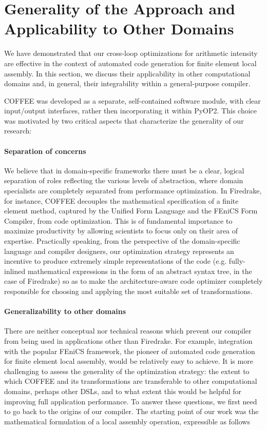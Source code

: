 \section{Generality of the Approach and Applicability to Other Domains}
\label{sec:generality}
We have demonstrated that our cross-loop optimizations for arithmetic intensity are effective in the context of automated code generation for finite element local assembly. In this section, we discuss their applicability in other computational domains and, in general, their integrability within a general-purpose compiler.

COFFEE was developed as a separate, self-contained software module, with clear input/output interfaces, rather then incorporating it within PyOP2. This choice was motivated by two critical aspects that characterize the generality of our research:

\paragraph{Separation of concerns} We believe that in domain-specific frameworks there must be a clear, logical separation of roles reflecting the various levels of abstraction, where domain specialists are completely separated from performance optimization. In Firedrake, for instance, COFFEE decouples the mathematical specification of a finite element method, captured by the Unified Form Language and the FEniCS Form Compiler, from code optimization. This is of fundamental importance to maximize productivity by allowing scientists to focus only on their area of expertise. Practically speaking, from the perspective of the domain-specific language and compiler designers, our optimization strategy represents an incentive to produce extremely simple representations of the code (e.g. fully-inlined mathematical expressions in the form of an abstract syntax tree, in the case of Firedrake) so as to make the architecture-aware code optimizer completely responsible for choosing and applying the most suitable set of transformations.

\paragraph{Generalizability to other domains} There are neither conceptual nor technical reasons which prevent our compiler from being used in applications other than Firedrake. For example, integration with the popular FEniCS framework, the pioneer of automated code generation for finite element local assembly, would be relatively easy to achieve. It is more challenging to assess the generality of the optimization strategy: the extent to which COFFEE and its transformations are transferable to other computational domains, perhaps other DSLs, and to what extent this would be helpful for improving full application performance. To answer these questions, we first need to go back to the origins of our compiler. The starting point of our work was the mathematical formulation of a local assembly operation, expressible as follows

